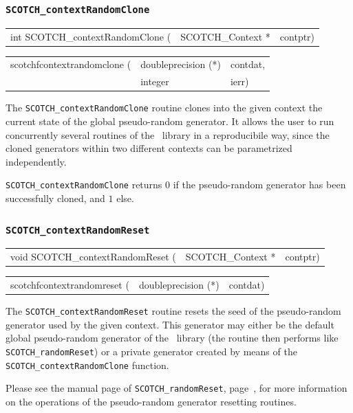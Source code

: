 \subsubsection{\texttt{SCOTCH\_contextRandomClone}}

\begin{itemize}
\progsyn

{\tt\begin{tabular}{l@{}ll}
int SCOTCH\_contextRandomClone ( & SCOTCH\_Context * & contptr)
\end{tabular}}

{\tt\begin{tabular}{l@{}ll}
scotchfcontextrandomclone ( & doubleprecision (*) & contdat, \\
                            & integer             & ierr)
\end{tabular}}

\progdes

The \texttt{SCOTCH\_contextRandomClone} routine clones into the given
context the current state of the global pseudo-random generator. It
allows the user to run concurrently several routines of the
\libscotch\ library in a reproducibile way, since the cloned
generators within two different contexts can be parametrized
independently.

\progret

\texttt{SCOTCH\_contextRandomClone} returns $0$ if the pseudo-random
generator has been successfully cloned, and $1$ else.
\end{itemize}

\subsubsection{\texttt{SCOTCH\_contextRandomReset}}

\begin{itemize}
\progsyn

{\tt\begin{tabular}{l@{}ll}
void SCOTCH\_contextRandomReset ( & SCOTCH\_Context * & contptr)
\end{tabular}}

{\tt\begin{tabular}{l@{}ll}
scotchfcontextrandomreset ( & doubleprecision (*) & contdat)
\end{tabular}}

\progdes

The {\tt SCOTCH\_contextRandomReset} routine resets the seed of the
pseudo-random generator used by the given context. This generator may
either be the default global pseudo-random generator of the
\libscotch\ library (the routine then performs like
\texttt{SCOTCH\_\lbt random\lbt Reset}) or a private generator created
by means of the \texttt{SCOTCH\_\lbt context\lbt Random\lbt Clone}
function.

Please see the manual page of \texttt{SCOTCH\_\lbt random\lbt Reset},
page~\pageref{sec-lib-random-reset}, for more information on the
operations of the pseudo-random generator resetting routines.
\end{itemize}


